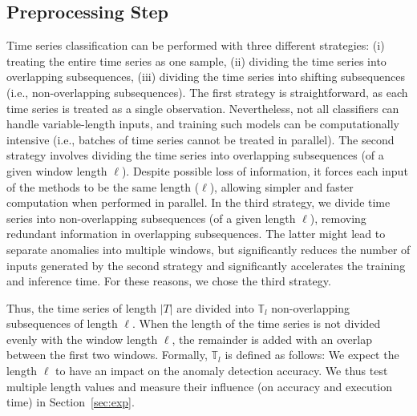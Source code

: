 \subsection{Preprocessing Step}
Time series classification can be performed with three different strategies: (i) treating the entire time series as one sample, (ii) dividing the time series into overlapping subsequences, (iii) dividing the time series into shifting subsequences (i.e., non-overlapping subsequences). The first strategy is straightforward, as each time series is treated as a single observation. Nevertheless, not all classifiers can handle variable-length inputs, and training such models can be computationally intensive (i.e., batches of time series cannot be treated in parallel). The second strategy involves dividing the time series into overlapping subsequences (of a given window length $\ell$). Despite possible loss of information, it forces each input of the methods to be the same length ($\ell$), allowing simpler and faster computation when performed in parallel. In the third strategy, we divide time series into non-overlapping subsequences (of a given length $\ell$), removing redundant information in overlapping subsequences. The latter might lead to separate anomalies into multiple windows, but significantly reduces the number of inputs generated by the second strategy and significantly accelerates the training and inference time. For these reasons, we chose the third strategy.

Thus, the time series of length $|T|$ are divided into $\mathbb{T}_l$ non-overlapping subsequences of length $\ell$. When the length of the time series is not divided evenly with the window length $\ell$, the remainder is added with an overlap between the first two windows. Formally, $\mathbb{T}_l$ is defined as follows:
We expect the length $\ell$ to have an impact on the anomaly detection accuracy. We thus test multiple length values and measure their influence (on accuracy and execution time) in Section~\ref{sec:exp}.

